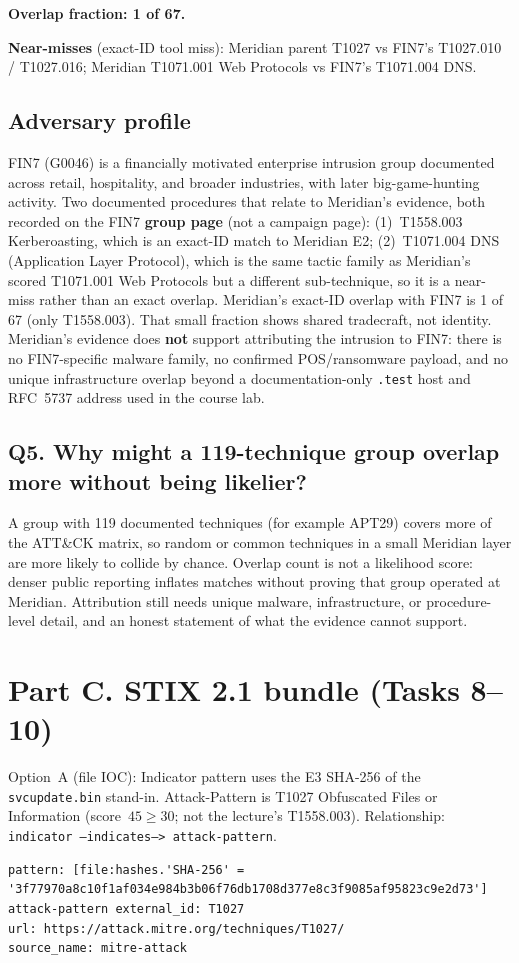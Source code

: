 \documentclass[11pt,letterpaper]{article}
\newcommand{\labpart}[1]{%
  \par\vspace{0.35em}%
  \Needspace{8\baselineskip}%
  \section*{#1}%
  \nopagebreak
}
\newcommand{\labstep}[1]{%
  \Needspace{6\baselineskip}%
  \subsection*{#1}%
  \nopagebreak
}
\begin{document}
\textbf{Overlap fraction: 1 of 67.}

\textbf{Near-misses} (exact-ID tool miss): Meridian parent T1027 vs FIN7's T1027.010 / T1027.016; Meridian T1071.001 Web Protocols vs FIN7's T1071.004 DNS.

\labstep{Adversary profile}

FIN7 (G0046) is a financially motivated enterprise intrusion group documented across retail, hospitality, and broader industries, with later big-game-hunting activity. Two documented procedures that relate to Meridian's evidence, both recorded on the FIN7 \textbf{group page} (not a campaign page): (1)~T1558.003 Kerberoasting, which is an exact-ID match to Meridian E2; (2)~T1071.004 DNS (Application Layer Protocol), which is the same tactic family as Meridian's scored T1071.001 Web Protocols but a different sub-technique, so it is a near-miss rather than an exact overlap. Meridian's exact-ID overlap with FIN7 is 1 of 67 (only T1558.003). That small fraction shows shared tradecraft, not identity. Meridian's evidence does \textbf{not} support attributing the intrusion to FIN7: there is no FIN7-specific malware family, no confirmed POS/ransomware payload, and no unique infrastructure overlap beyond a documentation-only \texttt{.test} host and RFC~5737 address used in the course lab.

\labstep{Q5. Why might a 119-technique group overlap more without being likelier?}

A group with 119 documented techniques (for example APT29) covers more of the ATT\&CK matrix, so random or common techniques in a small Meridian layer are more likely to collide by chance. Overlap count is not a likelihood score: denser public reporting inflates matches without proving that group operated at Meridian. Attribution still needs unique malware, infrastructure, or procedure-level detail, and an honest statement of what the evidence cannot support.

\labpart{Part C. STIX 2.1 bundle (Tasks 8--10)}

Option~A (file IOC): Indicator pattern uses the E3 SHA-256 of the \texttt{svcupdate.bin} stand-in. Attack-Pattern is T1027 Obfuscated Files or Information (score~$45 \ge 30$; not the lecture's T1558.003). Relationship: \texttt{indicator --indicates--> attack-pattern}.

\begin{lstlisting}
pattern: [file:hashes.'SHA-256' = '3f77970a8c10f1af034e984b3b06f76db1708d377e8c3f9085af95823c9e2d73']
attack-pattern external_id: T1027
url: https://attack.mitre.org/techniques/T1027/
source_name: mitre-attack
\end{lstlisting}
\end{document}
